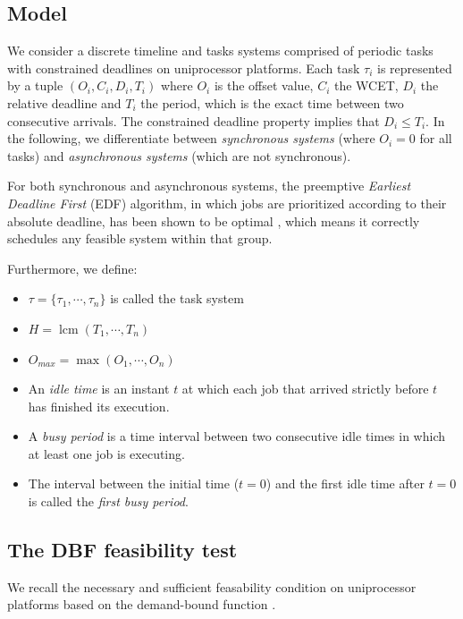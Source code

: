 \documentclass[conference]{IEEEtran}
\begin{document}

	\subsection{Model}
		We consider a discrete timeline and tasks systems comprised of periodic
		tasks with constrained deadlines on uniprocessor platforms. Each task
		$\tau_i$ is represented by a tuple $(O_i, C_i, D_i, T_i)$ where $O_i$ is the offset value,
		$C_i$ the WCET, $D_i$ the relative deadline and $T_i$ the period, which is the exact time between two consecutive arrivals.
		The constrained deadline property implies that $D_i \leq T_i$. In
		the following, we differentiate between \emph{synchronous systems} (where $O_i
		= 0$ for all tasks) and \emph{asynchronous systems} (which are not synchronous).

		For both synchronous and asynchronous systems, the preemptive
		\emph{Earliest Deadline First} (EDF) algorithm, in which jobs are prioritized according to their absolute deadline, has been
		shown to be optimal \cite{liu1973scheduling}, which means it
		correctly schedules any feasible system within that group.

		Furthermore, we define:
		\begin{itemize}
			\item $\tau = \{\tau_1, \cdots, \tau_{n}\}$ is called the task system
			\item $H = \operatorname{lcm}(T_1, \cdots, T_{n})$
			\item $O_{max} = \max (O_1, \cdots, O_{n})$
			\item An \emph{idle time} is an instant $t$ at which each job that arrived
			strictly before $t$ has finished its execution.
			\item A \emph{busy period} is a time interval between two consecutive idle times in
			which at least one job is executing.
			\item The interval between the initial time ($t=0$) and the first
			idle time after $t=0$ is called the \emph{first busy period}.
		\end{itemize}

	\subsection{The DBF feasibility test}
		We recall the necessary and sufficient feasability condition on uniprocessor
		platforms based on the demand-bound function \cite{baruah1999generalized,
		baruah1990algorithms}.
\end{document}
